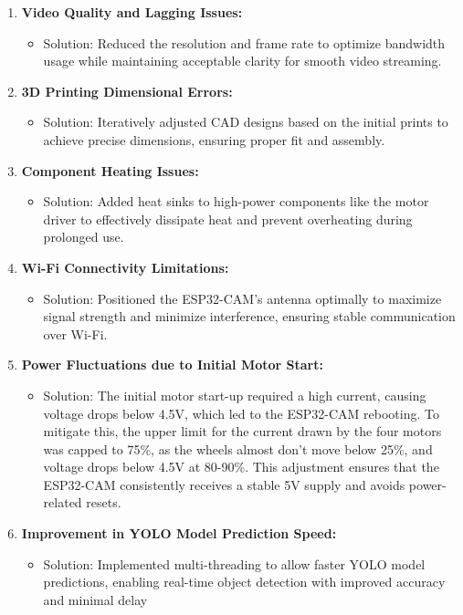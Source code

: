 \documentclass[12pt,a4paper]{report}
\begin{document}
\begin{enumerate}
    \item \textbf{Video Quality and Lagging Issues:} 
    \begin{itemize}
        \item Solution: Reduced the resolution and frame rate to optimize bandwidth usage while maintaining acceptable clarity for smooth video streaming.
    \end{itemize}


    \item \textbf{3D Printing Dimensional Errors:}
    \begin{itemize}
        \item Solution: Iteratively adjusted CAD designs based on the initial prints to achieve precise dimensions, ensuring proper fit and assembly.
    \end{itemize}

    \item \textbf{Component Heating Issues:}
    \begin{itemize}
        \item Solution: Added heat sinks to high-power components like the motor driver to effectively dissipate heat and prevent overheating during prolonged use.
    \end{itemize}

    \item \textbf{Wi-Fi Connectivity Limitations:}
    \begin{itemize}
        \item Solution: Positioned the ESP32-CAM’s antenna optimally to maximize signal strength and minimize interference, ensuring stable communication over Wi-Fi.
    \end{itemize}

    \item \textbf{Power Fluctuations due to Initial Motor Start:}
    \begin{itemize}
        \item Solution: The initial motor start-up required a high current, causing voltage drops below 4.5V, which led to the ESP32-CAM rebooting. To mitigate this, the upper limit for the current drawn by the four motors was capped to 75\%, as the wheels almost don't move below 25\%, and voltage drops below 4.5V at 80-90\%. This adjustment ensures that the ESP32-CAM consistently receives a stable 5V supply and avoids power-related resets.
    \end{itemize}
    
        \item \textbf{Improvement in YOLO Model Prediction Speed:}
    \begin{itemize}
\item Solution: Implemented multi-threading to allow faster YOLO model predictions, enabling real-time object detection with improved accuracy and minimal delay \cite{yolov10,homl}
    \end{itemize}
\end{enumerate}
\end{document}
